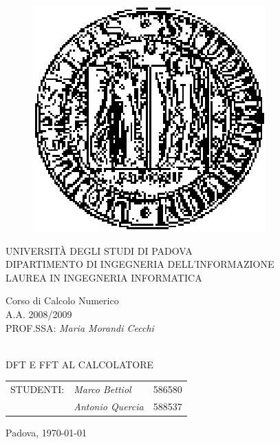 \begin{titlepage}

		\thispagestyle{empty}
    \begin{figure}
    \centering
    \includegraphics[scale=0.45]{immagini/tesi_logounipd2}
    \end{figure}
    
    \vskip 1.5cm{
    \begin{center}\sc
        UNIVERSIT\`A DEGLI STUDI DI PADOVA\\
        DIPARTIMENTO DI INGEGNERIA DELL'INFORMAZIONE\\
        LAUREA IN INGEGNERIA INFORMATICA\end{center}
		}
		
		\vskip1.2cm\begin{center}
    	\rm\large\expandafter{Corso di Calcolo Numerico\\}
      \rm\large\uppercase\expandafter{A.A. 2008/2009\\}
      \rm\large\uppercase\expandafter{Prof.ssa:}
    	\emph{Maria Morandi Cecchi}\end{center}
    	
    \vskip1.6cm\begin{center}
    \HRule \\[0.4cm]\LARGE\uppercase\expandafter{DFT e FFT al calcolatore}
    \HRule \\[0.4cm]
    \end{center}
    
    \begin{flushright}\vskip2.0cm 
    \begin{tabular}{rll}
	   \rm\large \uppercase{Studenti:}&\emph{Marco Bettiol} &586580\\
	   & \emph{Antonio Quercia} &588537\\
		\end{tabular}
		\end{flushright}
    \vfill\begin{center}\rm\normalsize Padova, \today \end{center}
    
\end{titlepage}


